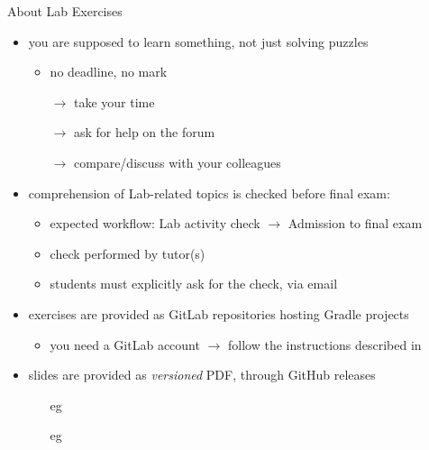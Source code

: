 \documentclass[presentation]{beamer}\mode<presentation>{\usetheme{AMSCesenaPurpleAndGold}}
\begin{document}
\begin{frame}[c]{About Lab Exercises}

	\begin{itemize}
		\item you are supposed to learn something, not just solving puzzles
		\begin{itemize}
			\item no deadline, no mark
			\item[$\rightarrow$] take your time
			\item[$\rightarrow$] ask for help on the forum
			\item[$\rightarrow$] compare/discuss with your colleagues
		\end{itemize}

		\vfill

		\item comprehension of Lab-related topics is checked before final exam:
		\begin{itemize}
			\item \alert{expected workflow:} Lab activity check $\rightarrow$ Admission to final exam
			\item check performed by tutor(s)
			\item students must explicitly ask for the check, via email
		\end{itemize}

		\vfill

		\item exercises are provided as GitLab repositories hosting Gradle projects
		\begin{itemize}
			\item you need a GitLab account $\rightarrow$ follow the instructions described in 
		\end{itemize}

        \vfill

        \item slides are provided as \emph{versioned} PDF, through GitHub releases
        \begin{itemize}
            \item[eg] 
            \item[eg] 
        \end{itemize}

	\end{itemize}

\end{frame}
\end{document}
